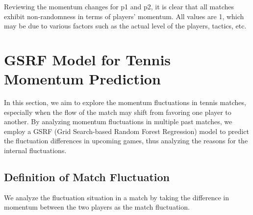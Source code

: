 \documentclass[12pt]{article}%
\begin{document}
\begin{table}[h] \centering \caption{Partial Match Inspection Data}
	\end{table}

Reviewing the momentum changes for p1 and p2, it is clear that all matches exhibit non-randomness in terms of players' momentum. All values are 1, which may be due to various factors such as the actual level of the players, tactics, etc.


\section{GSRF Model for Tennis Momentum Prediction}
In this section, we aim to explore the momentum fluctuations in tennis matches, especially when the flow of the match may shift from favoring one player to another. By analyzing momentum fluctuations in multiple past matches, we employ a GSRF (Grid Search-based Random Forest Regression) model to predict the fluctuation differences in upcoming games, thus analyzing the reasons for the internal fluctuations.
\subsection{Definition of Match Fluctuation}
We analyze the fluctuation situation in a match by taking the difference in momentum between the two players as the match fluctuation.
\end{document}
